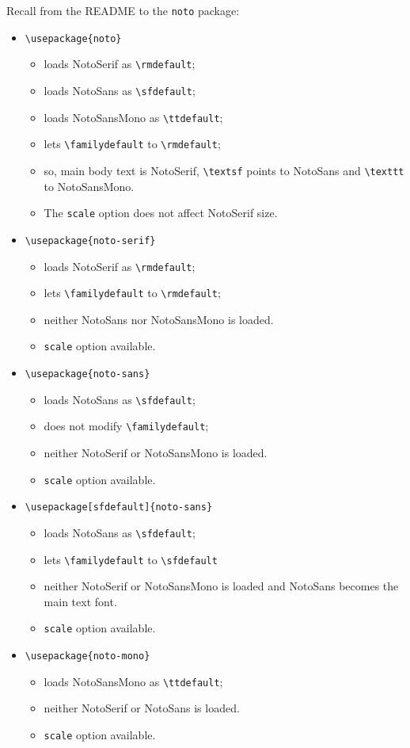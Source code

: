 \documentclass[]{article}
\begin{document}
Recall from the README to the {\tt noto} package:
\begin{itemize}
\item
\verb|\usepackage{noto}|
   \begin{itemize}
   \item loads NotoSerif as \verb|\rmdefault|;
   \item loads NotoSans as \verb|\sfdefault|;
  \item loads NotoSansMono as \verb|\ttdefault|;
   \item lets \verb|\familydefault| to \verb|\rmdefault|;
   \item so, main body text is NotoSerif, \verb|\textsf| points to NotoSans and \verb|\texttt| to NotoSansMono. 
   \item The {\tt scale} option does not affect NotoSerif size.
   \end{itemize}
\item
\verb|\usepackage{noto-serif}|
   \begin{itemize}
   \item loads NotoSerif as \verb|\rmdefault|;
   \item lets \verb|\familydefault| to \verb|\rmdefault|;
   \item neither NotoSans nor NotoSansMono is loaded.
   \item {\tt scale} option available.
   \end{itemize}
\item
\verb|\usepackage{noto-sans}|
   \begin{itemize}
   \item loads NotoSans as \verb|\sfdefault|;
   \item does not modify \verb|\familydefault|;
   \item neither NotoSerif or NotoSansMono is loaded.
   \item {\tt scale} option available.
\end{itemize}
\item
\verb|\usepackage[sfdefault]{noto-sans}| 
   \begin{itemize}
   \item loads NotoSans as \verb|\sfdefault|;
   \item lets \verb|\familydefault| to \verb|\sfdefault|
   \item neither NotoSerif or NotoSansMono is loaded and NotoSans becomes the main text font.
      \item {\tt scale} option available.
\end{itemize}
\item
\verb|\usepackage{noto-mono}|
   \begin{itemize}
   \item loads NotoSansMono as \verb|\ttdefault|;
   \item neither NotoSerif or NotoSans is loaded.   
      \item {\tt scale} option available.
\end{itemize}
\end{itemize}
\end{document}
